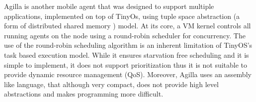 Agilla is another mobile agent that was designed to support multiple applications, implemented on top of TinyOs, using tuple space abstraction (a form of distributed shared memory \cite{Carriero:1989:LC:63334.63337}) model. At its core, a VM kernel controls all running agents on the node using a round-robin scheduler for concurrency. The use of the round-robin scheduling algorithm is an inherent limitation of TinyOS's task based execution model. While it ensures starvation free scheduling and it is simple to implement, it does not support prioritization thus it is not suitable to provide dynamic resource management (QoS). Moreover, Agilla uses an assembly like language, that although very compact, does not provide high level abstractions and makes programming more difficult. 

